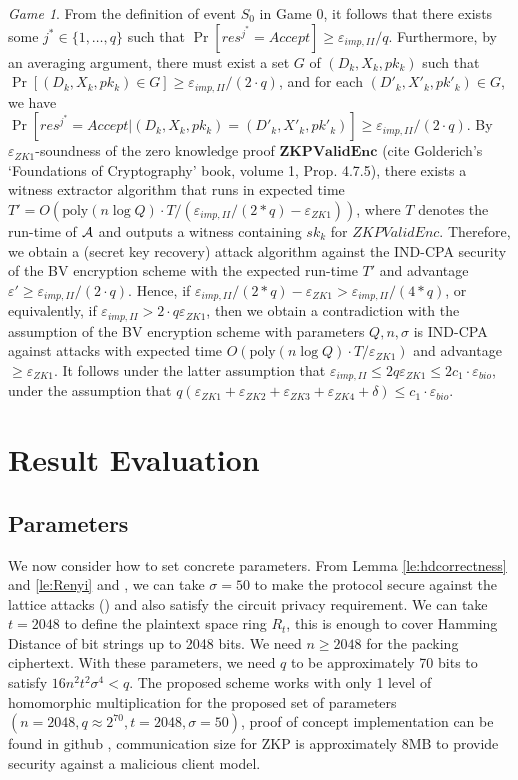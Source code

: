 \textit{Game 1}. From the definition of event $S_0$ in Game 0, it follows that there exists some $j^* \in \{1,\ldots,q\}$ such that $\Pr[res^{j^*} = Accept] \geq \varepsilon_{imp,II}/q$. Furthermore, by an averaging argument, there must exist a set $G$ of $(D_k,X_k,pk_k)$ such that $\Pr[(D_k,X_k,pk_k) \in G] \geq \varepsilon_{imp,II}/(2 \cdot q)$, and for each $(D'_k,X'_k,pk'_k) \in G$, we have $\Pr[res^{j^*} = Accept |(D_k,X_k,pk_k)=(D'_k,X'_k,pk'_k)] \geq  \varepsilon_{imp,II}/(2 \cdot q)$. By $\varepsilon_{ZK1}$-soundness of the zero knowledge proof $\mathbf{ZKPValidEnc}$ (cite Golderich's `Foundations of Cryptography' book, volume 1, Prop. 4.7.5), there exists a witness extractor algorithm that runs in expected time $T'=O(\mathrm{poly}(n \log Q) \cdot T / (\varepsilon_{imp,II}/(2*q) - \varepsilon_{ZK1}))$, where $T$ denotes the run-time of $\mathcal{A}$ and outputs a witness containing $sk_k$ for ${ZKPValidEnc}$. Therefore, we obtain a (secret key recovery) attack algorithm against the IND-CPA security of the BV encryption scheme with the expected run-time $T'$ and advantage $\varepsilon' \geq \varepsilon_{imp,II}/(2 \cdot q)$. Hence,  if $\varepsilon_{imp,II}/(2*q) - \varepsilon_{ZK1} > \varepsilon_{imp,II}/(4*q)$, or equivalently, if $\varepsilon_{imp,II} > 2 \cdot q \varepsilon_{ZK1}$, then we obtain a contradiction with the assumption of the BV encryption scheme with parameters $Q,n,\sigma$ is IND-CPA against attacks with expected time $O(\mathrm{poly}(n \log Q) \cdot T / \varepsilon_{ZK1})$ and advantage $\geq \varepsilon_{ZK1}$. It follows under the latter assumption that $\varepsilon_{imp,II} \leq 2q \varepsilon_{ZK1} \leq 2 c_1  \cdot \varepsilon_{bio}$, under the assumption that  $q(\varepsilon_{ZK1}+\varepsilon_{ZK2} +
\varepsilon_{ZK3} + \varepsilon_{ZK4} + \delta) \leq c_1 \cdot \varepsilon_{bio}$.


\section{Result Evaluation}

\subsection{Parameters}
\label{sec:parameters}
We now consider how to set concrete parameters. From Lemma \ref{le:hdcorrectness} and \ref{le:Renyi} and
\cite{naehrig2011can}, we can take \(\sigma = 50\) to make the protocol secure against the lattice attacks
(\cite{micciancio2008lattice}) and
also satisfy the circuit privacy requirement. We can take \(t = 2048\) to define the plaintext space ring \(R_{t}\),
this is enough to cover Hamming Distance of bit strings up to 2048 bits. We need \(n \geq 2048\) for the packing
ciphertext. With these parameters, we need \(q\) to be approximately 70 bits to satisfy \(16n^{2}t^{2}\sigma^{4} < q\).
The proposed scheme works with only 1 level of homomorphic multiplication for the proposed set of parameters
$(n = 2048, q \approx 2^{70}, t = 2048, \sigma = 50)$, proof of concept implementation can be found in github
\cite{rimrimrq38:online}, communication size for ZKP is approximately 8MB to provide security against a malicious client
model.

